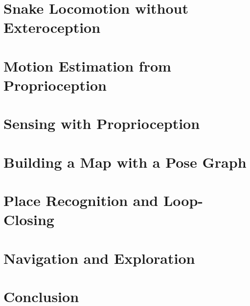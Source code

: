 \documentclass{USC-Thesis}
\begin{document}
\chapter{Snake Locomotion without Exteroception}



\chapter{Motion Estimation from Proprioception}

%

\chapter{Sensing with Proprioception}


\chapter{Building a Map with a Pose Graph}


\chapter{Place Recognition and Loop-Closing}


\chapter{Navigation and Exploration}


\chapter{Conclusion}


   
%
{}

\appendix    	%

%
\end{document}
